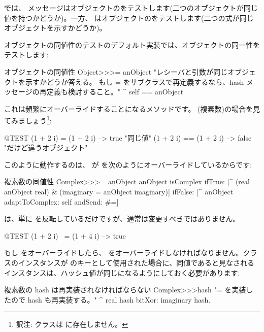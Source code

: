\documentclass[a4paper,10pt,twoside]{book}
\begin{document}
\st では、\ct{=} メッセージはオブジェクトのをテストします(\ie 二つのオブジェクトが同じ値を持つかどうか)。一方、\ct{==} はオブジェクトのをテストします(\ie 二つの式が同じオブジェクトを示すかどうか)。

オブジェクトの同値性のテストのデフォルト実装では、オブジェクトの同一性をテストします:
\begin{method}{オブジェクトの同値性}
Object>>>= anObject
    "レシーバと引数が同じオブジェクトを示すかどうか答える。
    もし = をサブクラスで再定義するなら、hash メッセージの再定義も検討すること。"
    ^ self == anObject
\end{method}

これは頻繁にオーバーライドすることになるメソッドです。 (複素数)の場合を見てみましょう\footnote{訳注:  クラスは  に存在しません。}:

\begin{code}{@TEST}
(1 + 2 i) = (1 + 2 i)   --> true     "同じ値"
(1 + 2 i) == (1 + 2 i) --> false    "だけど違うオブジェクト"
\end{code}

このように動作するのは、 が \ct{=} を次のようにオーバーライドしているからです:
\begin{method}{複素数の同値性}
Complex>>>= anObject
    anObject isComplex
        ifTrue: [^ (real = anObject real) & (imaginary = anObject imaginary)]
        ifFalse: [^ anObject adaptToComplex: self andSend: #=]
\end{method}

 は、単に \ct{=} を反転しているだけですが、通常は変更すべきではありません。

\begin{code}{@TEST}
(1 + 2 i) ~= (1 + 4 i) --> true
\end{code}

もし \ct{=} をオーバーライドしたら、 をオーバーライドしなければなりません。クラスのインスタンスが  のキーとして使用された場合に、同値であると見なされるインスタンスは、ハッシュ値が同じになるようにしておく必要があります:%
\begin{method}{複素数の hash は再実装されなければならない}
Complex>>>hash
    "= を実装したので hash も再実装する。"
    ^ real hash bitXor: imaginary hash.
\end{method}
\end{document}

